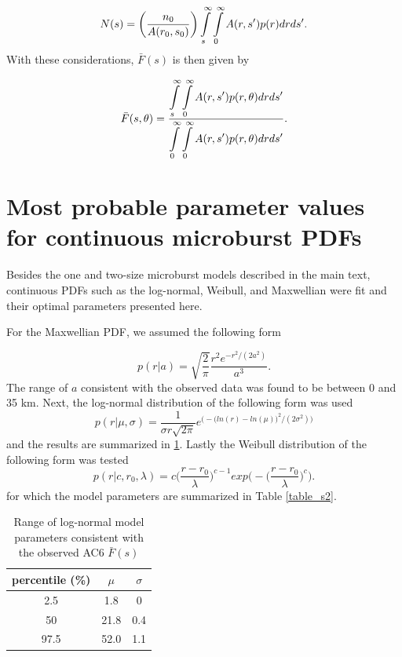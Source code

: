 \documentclass[draft]{agujournal2019}
\begin{document}
\begin{equation}
N(s) = \bigg( \frac{n_0}{A(r_0, s_0)} \bigg) \displaystyle\int\displaylimits_{s}^{\infty} \displaystyle\int\displaylimits_0^{\infty} A(r, s') p(r) dr ds'.
\end{equation} With these considerations, $\bar{F}(s)$ is then given by 

\begin{equation} \label{analytic_integral}
\bar{F}(s, \theta) = \frac{\displaystyle\int\displaylimits_{s}^{\infty} \displaystyle\int\displaylimits_0^{\infty} A(r, s') p(r, \theta) dr ds'}{\displaystyle\int\displaylimits_{0}^{\infty} \displaystyle\int\displaylimits_0^{\infty} A(r, s') p(r, \theta) dr ds'}.
\end{equation}

\section{Most probable parameter values for continuous microburst PDFs} \label{appendixb}
Besides the one and two-size microburst models described in the main text, continuous PDFs such as the log-normal, Weibull, and Maxwellian were fit and their optimal parameters presented here.

For the Maxwellian PDF, we assumed the following form

\begin{equation}
p(r | a) = \sqrt{\frac{2}{\pi}} \frac{r^2 e^{-r^2/(2a^2)}}{a^3}.
\end{equation} The range of $a$ consistent with the observed data was found to be between 0 and 35 km. Next, the log-normal distribution of the following form was used
\begin{equation}
p(r | \mu, \sigma) = \frac{1}{\sigma r \sqrt{2 \pi}} e^{\Big( -\big( ln(r) - ln(\mu) \big)^2/(2 \sigma^2) \Big)}
\end{equation} and the results are summarized in \ref{table_s1}. Lastly the Weibull distribution of the following form was tested
\begin{equation}
p(r | c, r_0, \lambda) = c \bigg(\frac{r-r_0}{\lambda}\bigg)^{c-1} exp \Bigg(- \bigg(\frac{r-r_0}{\lambda}\bigg)^{c} \Bigg).
\end{equation} for which the model parameters are summarized in Table \ref{table_s2}.

\begin{table}[h]
\caption{Range of log-normal model parameters consistent with the observed AC6  $\bar{F}(s)$}
\label{table_s1}
\centering
\begin{tabular}{|c|c|c|}
\hline 
percentile (\%) & $\mu$ & $\sigma$ \\ 
\hline 
2.5 & 1.8 & 0 \\ 
\hline 
50 & 21.8 & 0.4 \\ 
\hline 
97.5 & 52.0 & 1.1 \\ 
\hline 
\end{tabular} 
\end{table}
\end{document}
